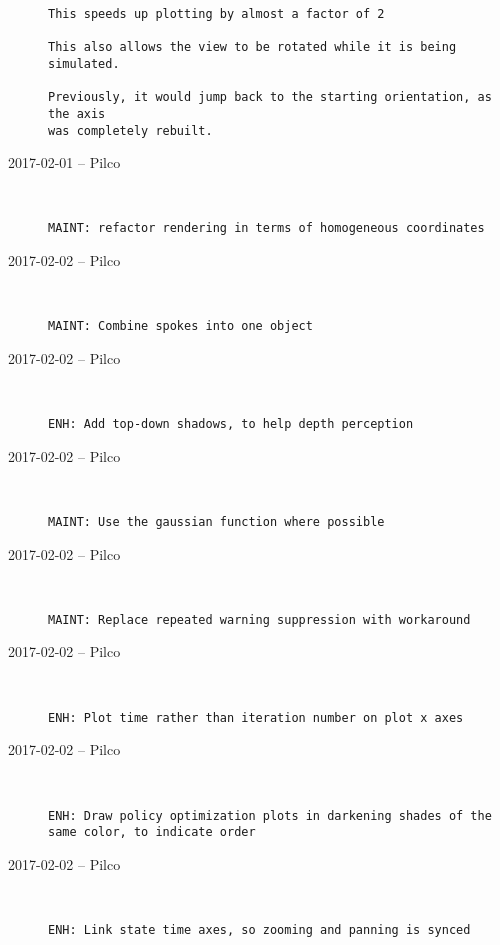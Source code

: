 \begin{description}
\begin{lstlisting}
This speeds up plotting by almost a factor of 2

This also allows the view to be rotated while it is being simulated.

Previously, it would jump back to the starting orientation, as the axis
was completely rebuilt.
\end{lstlisting}


  \item[2017-02-01 -- Pilco] \hfill \
\begin{lstlisting}
MAINT: refactor rendering in terms of homogeneous coordinates
\end{lstlisting}


  \item[2017-02-02 -- Pilco] \hfill \
\begin{lstlisting}
MAINT: Combine spokes into one object
\end{lstlisting}


  \item[2017-02-02 -- Pilco] \hfill \
\begin{lstlisting}
ENH: Add top-down shadows, to help depth perception
\end{lstlisting}


  \item[2017-02-02 -- Pilco] \hfill \
\begin{lstlisting}
MAINT: Use the gaussian function where possible
\end{lstlisting}


  \item[2017-02-02 -- Pilco] \hfill \
\begin{lstlisting}
MAINT: Replace repeated warning suppression with workaround
\end{lstlisting}


  \item[2017-02-02 -- Pilco] \hfill \
\begin{lstlisting}
ENH: Plot time rather than iteration number on plot x axes
\end{lstlisting}


  \item[2017-02-02 -- Pilco] \hfill \
\begin{lstlisting}
ENH: Draw policy optimization plots in darkening shades of the same color, to indicate order
\end{lstlisting}


  \item[2017-02-02 -- Pilco] \hfill \
\begin{lstlisting}
ENH: Link state time axes, so zooming and panning is synced
\end{lstlisting}



\end{description}

